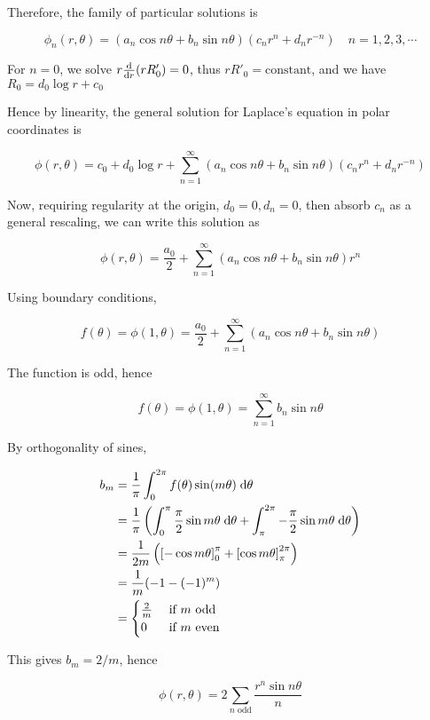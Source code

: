 \documentclass[a4paper]{article}
\begin{document}
Therefore, the family of particular solutions is

\[ \phi_{n}(r,\theta) = (a_{n} \cos n \theta + b_{n} \sin n \theta)(c_{n}r^{n}  + d_{n} r^{-n} ) \quad n = 1,2,3,\cdots \]

For $ n = 0 $, we solve $ r \frac{\mathrm{d} }{\mathrm{d} r}(r R'_{0}) = 0 $, thus $ r R'_{0} = \text{constant} $, and we have $ R_{0} = d_{0} \log r + c_{0} $ 

Hence by linearity, the general solution for Laplace's equation in polar coordinates is

\[ \phi(r,\theta) = c_{0} + d_{0} \log r + \sum_{n=1}^{\infty}  (a_{n} \cos n \theta  + b_{n} \sin n \theta )(c_{n}r^{n}  + d_{n}r^{-n} )  \]

Now, requiring regularity at the origin, $ d_{0}=0,d_{n} = 0 $, then absorb $ c_{n} $ as a general rescaling, we can write this solution as

\[ \phi(r,\theta)  = \frac{a_{0}}{2} + \sum_{n=1}^{\infty} (a_{n}  \cos n \theta + b_{n} \sin n \theta ) r^{n}  \]

Using boundary conditions,

\[ f(\theta) = \phi(1,\theta)  = \frac{a_{0}}{2} + \sum_{n=1}^{\infty} (a_{n}  \cos n \theta + b_{n} \sin n \theta ) \]


The function is odd, hence 

\[ f(\theta) = \phi(1,\theta)  = \sum_{n=1}^{\infty} b_{n} \sin n \theta \]

By orthogonality of sines, 

\begin{align*}
b_{m} & = \frac{1}{\pi} \int_{0}^{2 \pi} f(\theta) \sin (m \theta) \; \mathrm{d} \theta\\
& = \frac{1}{\pi} \left(  \int_{0}^{\pi} \frac{\pi}{2}  \sin m \theta  \; \mathrm{d} \theta + \int_{\pi}^{2\pi} - \frac{\pi}{2}  \sin m \theta \; \mathrm{d} \theta \right)   \\
& = \frac{1}{2m}  \left(  \left[  - \cos m \theta  \right]_{0}^{\pi}  + \left[  \cos m \theta \right]_{\pi}^{2\pi}  \right)  \\
& = \frac{1}{m} ( -1 - (-1)^{m}) \\
& = \begin{cases} \frac{2}{m}  & \text{ if } m \text{ odd} \\ 0 & \text{ if } m \text{ even} \end{cases}
\end{align*}

This gives $ b_{m} = 2 / m $, hence

\[ \phi(r,\theta)  = 2 \sum_{n \text{ odd}}  \frac{ r^{n} \sin n \theta }{n}  \]
\end{document}
